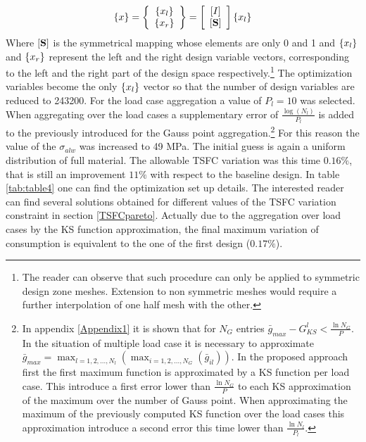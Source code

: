  \begin{equation}
 \left\lbrace{x}\right \rbrace=\left\lbrace{\begin{array}{c}
 \ensuremath\left\lbrace{x_l}\right \rbrace\\
  \ensuremath\left\lbrace{x_r}\right \rbrace
 \end{array}}\right \rbrace=\left[{\begin{array}{c}
  \left[{I}\right]\\
   \left[{\mathbf{S}}\right]
   \end{array}}\right]\left\lbrace{x_l}\right \rbrace
 \end{equation}
 Where $\left[{\mathbf{S}}\right]$ is the symmetrical mapping whose elements are only 0 and 1 and $\left\lbrace{x_l}\right \rbrace$ and $\left\lbrace{x_r}\right \rbrace$ represent the left and the right design variable vectors, corresponding to the left and the right part of the design space respectively.\footnote{The reader can observe that such procedure can only be applied to symmetric design zone meshes. Extension to non symmetric meshes would require a further interpolation of one half mesh with the other.}  The optimization variables become the only $\left\lbrace{x_l}\right \rbrace$ vector so that the number of design variables are reduced to 243200. For the load case aggregation a value of $P_l=10$ was selected.  When aggregating over the load cases a supplementary error of $\frac{\log(N_l)}{P_l}$ is added to the previously introduced for the Gauss point aggregation.\footnote{In appendix \ref{Appendix1} it is shown that for $N_G$ entries $\bar{g}_{max}-G_{KS}^l<\frac{\ln{N_G}}{P}$. In the situation of multiple load case it is necessary to approximate $\bar{g}_{max}=\max_{l=1,2,...,N_l}(\max_{i=1,2,...,N_G}(\bar{g}_{il}))$. In the proposed approach first the first maximum function is approximated by a KS function per load case. This introduce a first error lower than $\frac{\ln{N_G}}{P}$ to each KS approximation of the maximum over the number of Gauss point. When approximating the maximum of the previously computed KS function over the load cases this approximation introduce a second error this time lower than $\frac{\ln{N_l}}{P_l}$.}  For this reason the value of the $\sigma_{alw}$ was increased to 49 MPa. The initial guess is again a uniform distribution of full material. The allowable TSFC variation was this time $0.16 \%$, that is still an improvement  $11 \%$ with respect to the baseline design.  In table \ref{tab:table4} one can find the optimization set up details. The interested reader can find several solutions obtained for different values of the TSFC variation constraint in section \ref{TSFCpareto}. Actually due to the aggregation over load cases by the KS function approximation, the final maximum variation of consumption is equivalent to the one of the first design ($0.17 \%$).
  
